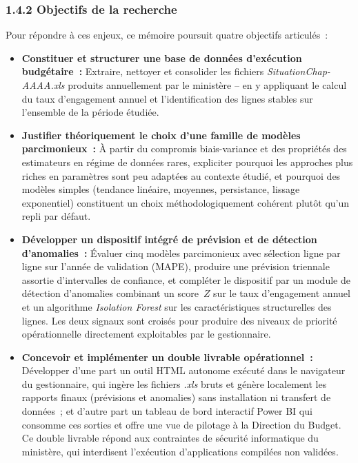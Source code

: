 \subsubsection*{1.4.2 \quad Objectifs de la recherche}

Pour r\'epondre \`a ces enjeux, ce m\'emoire poursuit quatre objectifs articul\'es~:

\begin{itemize}
    \item \textbf{Constituer et structurer une base de donn\'ees d'ex\'ecution budg\'etaire~:}
    Extraire, nettoyer et consolider les fichiers \textit{SituationChap-AAAA.xls} produits annuellement par le minist\`ere -- en y appliquant le calcul du taux d'engagement annuel et l'identification des lignes stables sur l'ensemble de la p\'eriode \'etudi\'ee.

    \item \textbf{Justifier th\'eoriquement le choix d'une famille de mod\`eles parcimonieux~:}
    \`A partir du compromis biais-variance et des propri\'et\'es des estimateurs en r\'egime de donn\'ees rares, expliciter pourquoi les approches plus riches en param\`etres sont peu adapt\'ees au contexte \'etudi\'e, et pourquoi des mod\`eles simples (tendance lin\'eaire, moyennes, persistance, lissage exponentiel) constituent un choix m\'ethodologiquement coh\'erent plut\^ot qu'un repli par d\'efaut.

    \item \textbf{D\'evelopper un dispositif int\'egr\'e de pr\'evision et de d\'etection d'anomalies~:}
    \'Evaluer cinq mod\`eles parcimonieux avec s\'election ligne par ligne sur l'ann\'ee de validation (MAPE), produire une pr\'evision triennale assortie d'intervalles de confiance, et compl\'eter le dispositif par un module de d\'etection d'anomalies combinant un score~$Z$ sur le taux d'engagement annuel et un algorithme \textit{Isolation Forest} sur les caract\'eristiques structurelles des lignes. Les deux signaux sont crois\'es pour produire des niveaux de priorit\'e op\'erationnelle directement exploitables par le gestionnaire.

    \item \textbf{Concevoir et impl\'ementer un double livrable op\'erationnel~:}
    D\'evelopper d'une part un outil HTML autonome ex\'ecut\'e dans le navigateur du gestionnaire, qui ing\`ere les fichiers \textit{.xls} bruts et g\'en\`ere localement les rapports finaux (pr\'evisions et anomalies) sans installation ni transfert de donn\'ees~; et d'autre part un tableau de bord interactif Power BI qui consomme ces sorties et offre une vue de pilotage \`a la Direction du Budget. Ce double livrable r\'epond aux contraintes de s\'ecurit\'e informatique du minist\`ere, qui interdisent l'ex\'ecution d'applications compil\'ees non valid\'ees.
\end{itemize}

